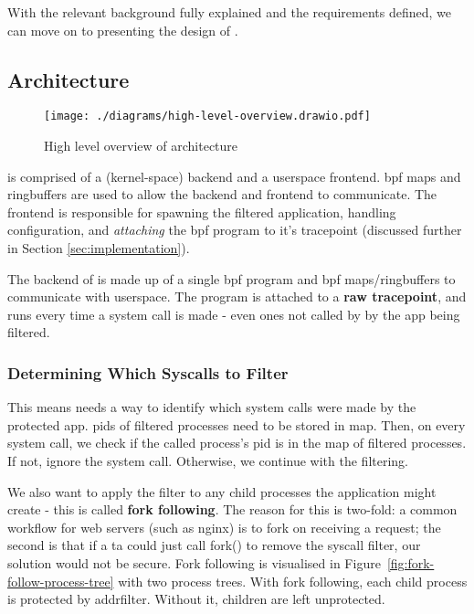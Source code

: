 With the relevant background fully explained and the requirements defined, we
can move on to presenting the design of \afss.~ 

\subsection{Architecture} \label{subsec:arch}

\begin{figure}[ht]
    \centering
    \texttt{[image: ./diagrams/high-level-overview.drawio.pdf]} 
    \caption{High level overview of \afg architecture}
    \label{fig:arch-overview}
\end{figure}

\af is comprised of a (kernel-space) backend and a userspace frontend.
\ac{bpf} maps and ringbuffers are used to allow the backend and frontend to
communicate. The frontend is responsible for spawning the filtered application,
handling configuration, and \textit{attaching} the \ac{bpf} program to it's
tracepoint (discussed further in Section \ref{sec:implementation}).

The backend of \af is made up of a single \ac{bpf} program and \ac{bpf}
maps/ringbuffers to communicate with userspace.
The program is attached to a \textbf{raw tracepoint}, and runs every time
a system call is made - even ones not called by by the app being filtered.

\subsubsection{Determining Which Syscalls to
Filter}\label{subsec:design-fork-following}

This means \af needs a way to identify which system calls were made by the
protected app. \acp{pid} of filtered processes
need to be stored in  map. Then, on every system call, we check if the
called process's \ac{pid} is in the map of filtered processes. If not, ignore
the system call. Otherwise, we continue with the filtering.

We also want to apply the filter to any child processes the
application might create - this is called \textbf{fork following}. The reason for this is two-fold: a common workflow for
web servers (such as nginx) \cite{apache-prefork-2.4, nginx-inside-performance-scale-2015} is to fork on receiving a request; the second is
that if a \ac{ta} could just call fork() to remove the syscall filter, our
solution would not be secure. Fork following is visualised in
Figure~\ref{fig:fork-follow-process-tree} with two process trees. With fork
following, each child process is protected by addrfilter. Without it, children
are left unprotected.

